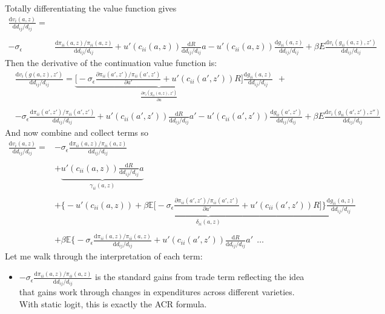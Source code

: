 \documentclass[12pt,pdftex]{article}
\begin{document}
\begin{onehalfspacing}
Totally differentiating the value function gives
\begin{align}
\frac{\mathrm{d} v_i(a, z)}{\mathrm{d} d_{ij} / d_{ij}} =& \nonumber  \\
\nonumber \\
 -\sigma_{\epsilon} & \frac{\mathrm{d} \pi_{ii}(a,z) / \pi_{ii}(a,z)}{\mathrm{d}d_{ij} / d_{ij}}  + u'(c_{ii}(a,z))\frac{\mathrm{d} R}{\mathrm{d} d_{ij} / d_{ij}}a - u'(c_{ii}(a,z))\frac{\mathrm{d} g_{ii}(a,z)}{\mathrm{d} d_{ij} / d_{ij}}
+ \beta E \frac{\mathrm{d} v_i(g_{ii}(a,z), z')}{\mathrm{d} d_{ij} / d_{ij}}
\end{align}
Then the derivative of the continuation value function is:
\begin{align}
& \frac{\mathrm{d} v_i(g(a,z), z')}{\mathrm{d} d_{ij} / d_{ij}} = \underbrace{\bigg [-\sigma_{\epsilon} \frac{\partial \pi_{ii}(a',z') / \pi_{ii}(a',z')}{\partial a'} + u'(c_{ii}(a',z'))R \bigg ]}_{\frac{\partial v_i(g_{ii}(a,z), z')}{\partial a}}\frac{\mathrm{d} g_{ii}(a,z)}{\mathrm{d} d_{ij} / d_{ij}} \ \ + \\
\nonumber \\
& -\sigma_{\epsilon} \frac{\mathrm{d} \pi_{ii}(a',z') / \pi_{ii}(a',z')}{\mathrm{d}d_{ij} / d_{ij}}   + u'(c_{ii}(a',z'))\frac{\mathrm{d} R}{\mathrm{d} d_{ij} / d_{ij}}a' - u'(c_{ii}(a',z'))\frac{\mathrm{d} g_{ii}(a',z')}{\mathrm{d} d_{ij} / d_{ij}}
+ \beta E \frac{\mathrm{d} v_i(g_{ii}(a',z'), z'')}{\mathrm{d} d_{ij} / d_{ij}}
\end{align}
And now combine and collect terms so
\begin{align}
\frac{\mathrm{d} v_i(a, z)}{\mathrm{d} d_{ij} / d_{ij}} =& -\sigma_{\epsilon} \frac{\mathrm{d} \pi_{ii}(a,z) / \pi_{ii}(a,z)}{\mathrm{d}d_{ij} / d_{ij}} \\
\nonumber \\
& + \underbrace{u'(c_{ii}(a,z))\frac{\mathrm{d} R}{\mathrm{d} d_{ij} / d_{ij}}a}_{\gamma_{ii}(a,z)}  \\
\nonumber \\
& + \underbrace{\bigg \{- u'(c_{ii}(a,z)) + \beta \mathbb{E} \big [-\sigma_{\epsilon} \frac{\partial \pi_{ii}(a',z') / \pi_{ii}(a',z')}{\partial a'} + u'(c_{ii}(a',z'))R \big ] \bigg \}\frac{\mathrm{d} g_{ii}(a,z)}{\mathrm{d} d_{ij} / d_{ij}}}_{\delta_{ii}(a,z)} \\
\nonumber \\
& + \beta \mathbb{E} \bigg \{ -\sigma_{\epsilon} \frac{\mathrm{d} \pi_{ii}(a,z) / \pi_{ii}(a,z)}{\mathrm{d}d_{ij} / d_{ij}} +  u'(c_{ii}(a',z'))\frac{\mathrm{d} R}{\mathrm{d} d_{ij} / d_{ij}}a' \ \  \ldots
\label{eq:apx-welfare-vterms}
\end{align}
Let me walk through the interpretation of each term:
\begin{itemize}
\item $-\sigma_{\epsilon} \frac{\mathrm{d} \pi_{ii}(a,z) / \pi_{ii}(a,z)}{\mathrm{d}d_{ij} / d_{ij}}$ is the standard gains from trade term reflecting the idea that gains work through changes in expenditures across different varieties. With static logit, this is exactly the ACR formula.


\end{itemize}
\end{onehalfspacing}
\end{document}

